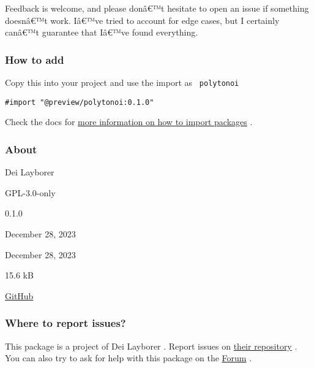 Feedback is welcome, and please donâ€™t hesitate to open an issue if
something doesnâ€™t work. Iâ€™ve tried to account for edge cases, but I
certainly canâ€™t guarantee that Iâ€™ve found everything.

\subsubsection{How to add}\label{how-to-add}

Copy this into your project and use the import as \texttt{\ polytonoi\ }

\begin{verbatim}
#import "@preview/polytonoi:0.1.0"
\end{verbatim}



Check the docs for
\href{https://typst.app/docs/reference/scripting/\#packages}{more
information on how to import packages} .

\subsubsection{About}\label{about}

\begin{description}
\tightlist
\item[Author :]
Dei Layborer
\item[License:]
GPL-3.0-only
\item[Current version:]
0.1.0
\item[Last updated:]
December 28, 2023
\item[First released:]
December 28, 2023
\item[Archive size:]
15.6 kB
\href{https://packages.typst.org/preview/polytonoi-0.1.0.tar.gz}{\pandocbounded{}}
\item[Repository:]
\href{https://github.com/dei-layborer/polytonoi}{GitHub}
\end{description}

\subsubsection{Where to report issues?}\label{where-to-report-issues}

This package is a project of Dei Layborer . Report issues on
\href{https://github.com/dei-layborer/polytonoi}{their repository} . You
can also try to ask for help with this package on the
\href{https://forum.typst.app}{Forum} .


